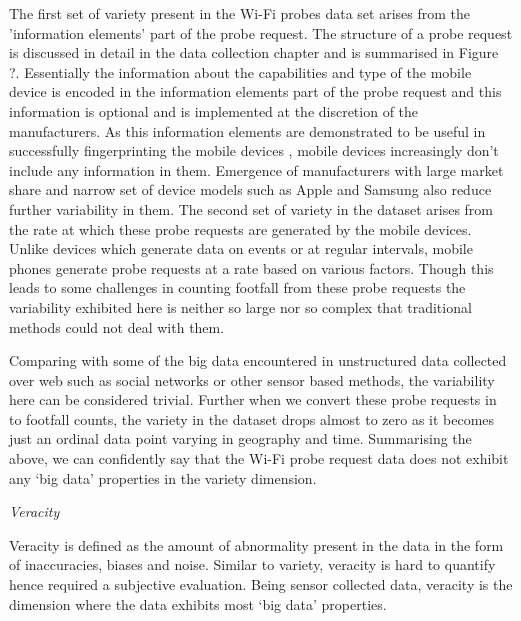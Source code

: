 The first set of variety present in the Wi-Fi probes data set arises from the 'information elements' part of the probe request.
The structure of a probe request is discussed in detail in the data collection chapter and is summarised in Figure ?.
Essentially the information about the capabilities and type of the mobile device is encoded in the information elements part of the probe request and this information is optional and is implemented at the discretion of the manufacturers.
As this information elements are demonstrated to be useful in successfully fingerprinting the mobile devices \cite{vanhoef2016}, mobile devices increasingly don't include any information in them.
Emergence of manufacturers with large market share and narrow set of device models such as Apple and Samsung also reduce further variability in them.
The second set of variety in the dataset arises from the rate at which these probe requests are generated by the mobile devices. 
Unlike devices which generate data on events or at regular intervals, mobile phones generate probe requests at a rate based on various factors.
Though this leads to some challenges in counting footfall from these probe requests the variability exhibited here is neither so large nor so complex that traditional methods could not deal with them.

Comparing with some of the big data encountered in unstructured data collected over web such as social networks or other sensor based methods, the variability here can be considered trivial.
Further when we convert these probe requests in to footfall counts, the variety in the dataset drops almost to zero as it becomes just an ordinal data point varying in geography and time.
Summarising the above, we can confidently say that the Wi-Fi probe request data does not exhibit any `big data' properties in the variety dimension.


\vspace{1.5em}\noindent\textit{Veracity}\vspace{0.5em}

Veracity is defined as the amount of abnormality present in the data in the form of inaccuracies, biases and noise.
Similar to variety, veracity is hard to quantify hence required a subjective evaluation.
Being sensor collected data, veracity is the dimension where the data exhibits most `big data' properties.


